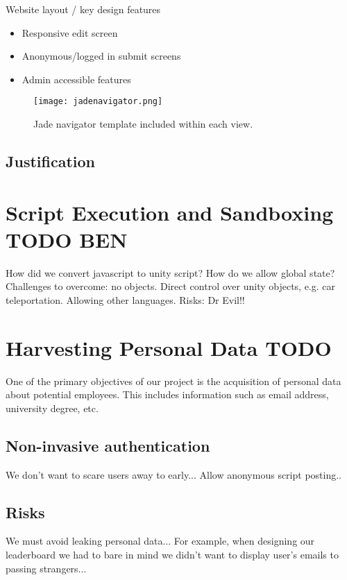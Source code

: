 Website layout / key design features
\begin{itemize}
\item Responsive edit screen
\item Anonymous/logged in submit screens
\item Admin accessible features
\end{itemize}

\begin{figure}[H]
\centering
\texttt{[image: jadenavigator.png]}
\caption{Jade navigator template included within each view.}
\end{figure}


\subsection{Justification}

\section{Script Execution and Sandboxing TODO {\color{green} BEN}}
How did we convert javascript to unity script?
How do we allow global state?
Challenges to overcome: no objects. Direct control over unity objects, e.g. car teleportation. Allowing other languages.
Risks: Dr Evil!!

\section{Harvesting Personal Data TODO}
One of the primary objectives of our project is the acquisition of personal data about potential employees. This includes information such as email address, university degree, etc.
\subsection{Non-invasive authentication}
We don't want to scare users away to early...
Allow anonymous script posting..
\subsection{Risks}
We must avoid leaking personal data...
For example, when designing our leaderboard we had to bare in mind we didn't want to display user's emails to passing strangers...


